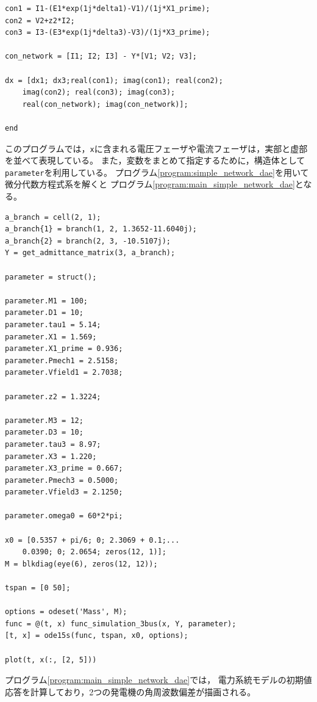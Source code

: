 \documentclass[tombow,dvipdfmx]{corona-a5-1.1}
\begin{document}
\begin{例}[電力系統のシミュレーションの単純な実装]
\begin{PROGRAMA}[count,title={func\_simulation\_3bus.m}]
\begin{verbatim}
con1 = I1-(E1*exp(1j*delta1)-V1)/(1j*X1_prime);
con2 = V2+z2*I2;
con3 = I3-(E3*exp(1j*delta3)-V3)/(1j*X3_prime);

con_network = [I1; I2; I3] - Y*[V1; V2; V3];

dx = [dx1; dx3;real(con1); imag(con1); real(con2);
    imag(con2); real(con3); imag(con3);
    real(con_network); imag(con_network)];

end
\end{verbatim}
\end{PROGRAMA}

このプログラムでは，\verb|x|に含まれる電圧フェーザや電流フェーザは，実部と虚部を並べて表現している。
また，変数をまとめて指定するために，構造体として\verb|parameter|を利用している。
プログラム\ref{program:simple_network_dae}を用いて微分代数方程式系を解くと
プログラム\nobreak\ref{program:main_simple_network_dae}となる。

\smallskip
\begin{PROGRAMA}[count,title={main\_simulation\_simple.m}]\label{program:main_simple_network_dae}
\begin{verbatim}
a_branch = cell(2, 1);
a_branch{1} = branch(1, 2, 1.3652-11.6040j);
a_branch{2} = branch(2, 3, -10.5107j);
Y = get_admittance_matrix(3, a_branch);

parameter = struct();

parameter.M1 = 100;
parameter.D1 = 10;
parameter.tau1 = 5.14;
parameter.X1 = 1.569;
parameter.X1_prime = 0.936;
parameter.Pmech1 = 2.5158;
parameter.Vfield1 = 2.7038;

parameter.z2 = 1.3224;

parameter.M3 = 12;
parameter.D3 = 10;
parameter.tau3 = 8.97;
parameter.X3 = 1.220;
parameter.X3_prime = 0.667;
parameter.Pmech3 = 0.5000;
parameter.Vfield3 = 2.1250;

parameter.omega0 = 60*2*pi;

x0 = [0.5357 + pi/6; 0; 2.3069 + 0.1;...
    0.0390; 0; 2.0654; zeros(12, 1)];
M = blkdiag(eye(6), zeros(12, 12));

tspan = [0 50];

options = odeset('Mass', M);
func = @(t, x) func_simulation_3bus(x, Y, parameter);
[t, x] = ode15s(func, tspan, x0, options); 

plot(t, x(:, [2, 5]))
\end{verbatim}
\end{PROGRAMA}

プログラム\nobreak\ref{program:main_simple_network_dae}では，
電力系統モデルの初期値応答を計算しており，2つの発電機の角周波数偏差が描画される。
\end{例}
\end{document}
